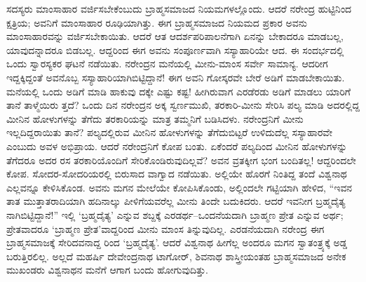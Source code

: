 ಸದಸ್ಯರು ಮಾಂಸಾಹಾರ ವರ್ಜಿಸಬೇಕೆಂಬುದು ಬ್ರಾಹ್ಮಸಮಾಜದ ನಿಯಮಗಳಲ್ಲೊಂದು. ಆದರೆ ನರೇಂದ್ರ ಹುಟ್ಟಿನಿಂದ ಕ್ಷತ್ರಿಯ; ಅವನಿಗೆ ಮಾಂಸಾಹಾರ ರೂಢಿಯಾಗಿತ್ತು. ಈಗ ಬ್ರಾಹ್ಮಸಮಾಜದ ನಿಯಮದ ಪ್ರಕಾರ ಅವನು ಮಾಂಸಾಹಾರವನ್ನು ವರ್ಜಿಸಬೇಕಾಯಿತು. ಆದರೆ ಆತ ಆದರ್ಶಪರಿಪಾಲನೆಗಾಗಿ ಏನನ್ನು ಬೇಕಾದರೂ ಮಾಡಬಲ್ಲ, ಯಾವುದನ್ನಾದರೂ ಬಿಡಬಲ್ಲ. ಆದ್ದರಿಂದ ಈಗ ಅವನು ಸಂಪೂರ್ಣವಾಗಿ ಸಸ್ಯಾಹಾರಿಯೇ ಆದ. ಈ ಸಂದರ್ಭದಲ್ಲಿ ಒಂದು ಸ್ವಾರಸ್ಯಕರ ಘಟನೆ ನಡೆಯಿತು. ನರೇಂದ್ರನ ಮನೆಯಲ್ಲಿ ಮೀನು-ಮಾಂಸ ಸರ್ವೇ ಸಾಮಾನ್ಯ. ಆದರೀಗ ಇದ್ದಕ್ಕಿದ್ದಂತೆ ಅವನೊಬ್ಬ ಸಸ್ಯಾಹಾರಿಯಾಗಿಬಿಟ್ಟಿದ್ದಾನೆ! ಈಗ ಅವನಿ ಗೋಸ್ಕರವೇ ಬೇರೆ ಅಡಿಗೆ ಮಾಡಬೇಕಾಯಿತು. ಮನೆಯಲ್ಲಿ ಒಂದು ಅಡಿಗೆ ಮಾಡಿ ಹಾಕುವು ದಕ್ಕೇ ಎಷ್ಟು ಕಷ್ಟ! ಹೀಗಿರುವಾಗ ಎರಡೆರಡು ಅಡಿಗೆ ಮಾಡಲು ಯಾರಿಗೆ ತಾನೆ ತಾಳ್ಮೆಯಿರು ತ್ತದೆ? ಒಂದು ದಿನ ನರೇಂದ್ರನ ಅಕ್ಕ ಸ್ವರ್ಣಮುಖಿ, ತರಕಾರಿ-ಮೀನು ಸೇರಿಸಿ ಪಲ್ಯ ಮಾಡಿ ಅದರಲ್ಲಿದ್ದ ಮೀನಿನ ಹೋಳುಗಳನ್ನು ತೆಗೆದು ತರಕಾರಿಯನ್ನು ಮಾತ್ರ ತಮ್ಮನಿಗೆ ಬಡಿಸಿದಳು. ನರೇಂದ್ರನಿಗೆ ಮೀನು ಇಲ್ಲದಿದ್ದರಾಯಿತು ತಾನೆ? ಪಲ್ಯದಲ್ಲಿರುವ ಮೀನಿನ ಹೋಳುಗಳನ್ನು ತೆಗೆದುಬಿಟ್ಟರೆ ಉಳಿದುದೆಲ್ಲ ಸಸ್ಯಾಹಾರವೇ ಎಂಬುದು ಅವಳ ಅಭಿಪ್ರಾಯ. ಆದರೆ ನರೇಂದ್ರನಿಗೆ ಕೋಪ ಬಂತು. ಏಕೆಂದರೆ ಪಲ್ಯದಿಂದ ಮೀನಿನ ಹೋಳುಗಳನ್ನು ತೆಗೆದರೂ ಅದರ ರಸ ತರಕಾರಿಯೊಂದಿಗೆ ಸೇರಿಕೊಂಡಿರುವುದಿಲ್ಲವೆ? ಅವನ ವ್ರತಕ್ಕೀಗ ಭಂಗ ಬಂದಿತಲ್ಲ! ಆದ್ದರಿಂದಲೇ ಕೋಪ. ಸೋದರ-ಸೋದರಿಯರಲ್ಲಿ ಬಿರುಸಾದ ವಾಗ್ವಾದ ನಡೆಯಿತು. ಅಲ್ಲಿಯೇ ಹೊರಗೆ ನಿಂತಿದ್ದ ತಂದೆ ವಿಶ್ವನಾಥ ಎಲ್ಲವನ್ನೂ ಕೇಳಿಸಿಕೊಂಡ. ಅವನು ಮಗನ ಮೇಲೆಯೇ ಕೋಪಿಸಿಕೊಂಡು, ಅಲ್ಲಿಂದಲೇ ಗಟ್ಟಿಯಾಗಿ ಹೇಳಿದ, “ಇವನ ತಾತ ಮುತ್ತಾತರಾದಿಯಾಗಿ ಹದಿನಾಲ್ಕು ಪೀಳಿಗೆಯವರೆಲ್ಲ ಮೀನು ತಿಂದೇ ಬದುಕಿದರು. ಆದರೆ ಇವನೀಗ ಬ್ರಹ್ಮದೈತ್ಯ ನಾಗಿಬಿಟ್ಟಿದ್ದಾನೆ!” ಇಲ್ಲಿ ‘ಬ್ರಹ್ಮದೈತ್ಯ’ ಎನ್ನುವ ಶಬ್ದಕ್ಕೆ ಎರಡರ್ಥ–ಒಂದನೆಯದಾಗಿ ಬ್ರಾಹ್ಮಣ ಪ್ರೇತ ಎನ್ನುವ ಅರ್ಥ; ಪ್ರೇತವಾದರೂ ‘ಬ್ರಾಹ್ಮಣ ಪ್ರೇತ’ವಾದ್ದರಿಂದ ಮೀನು ಮಾಂಸ ತಿನ್ನುವುದಿಲ್ಲ. ಎರಡನೆಯದಾಗಿ ನರೇಂದ್ರ ಈಗ ಬ್ರಾಹ್ಮಸಮಾಜಕ್ಕೆ ಸೇರಿದವನಾದ್ದ ರಿಂದ ‘ಬ್ರಹ್ಮದೈತ್ಯ’. ಆದರೆ ವಿಶ್ವನಾಥ ಹೀಗೆಲ್ಲ ಅಂದರೂ ಮಗನ ಸ್ವಾತಂತ್ರ್ಯಕ್ಕೆ ಅಡ್ಡ ಬರುತ್ತಿರಲಿಲ್ಲ. ಅಲ್ಲದೆ ಮಹರ್ಷಿ ದೇವೇಂದ್ರನಾಥ ಟಾಗೋರ್, ಶಿವನಾಥ ಶಾಸ್ತ್ರೀಯಂತಹ ಬ್ರಾಹ್ಮಸಮಾಜದ ಅನೇಕ ಮುಖಂಡರು ವಿಶ್ವನಾಥನ ಮನೆಗೆ ಆಗಾಗ ಬಂದು ಹೋಗುವುದಿತ್ತು.

